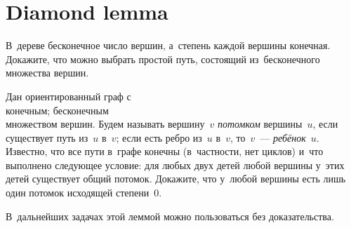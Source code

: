 
\section*{Diamond lemma}


\begin{problems}

\item
В~дереве бесконечное число вершин, а~степень каждой вершины конечная.
Докажите, что можно выбрать простой путь, состоящий из~бесконечного множества
вершин.

\item {}
Дан ориентированный граф с
\\
\subproblem конечным;
\quad
\subproblem бесконечным
\\
множеством вершин.
Будем называть вершину~$v$ \emph{потомком} вершины~$u$, если существует путь
из~$u$ в~$v$;
если есть ребро из~$u$ в~$v$, то~$v$~--- \emph{ребёнок}~$u$.
Известно, что все пути в~графе конечны (в~частности, нет циклов) и~что
выполнено следующее условие: для любых двух детей любой вершины у~этих детей
существует общий потомок.
Докажите, что у~любой вершины есть лишь один потомок исходящей степени~$0$.

\end{problems}

В~дальнейших задачах этой леммой можно пользоваться без доказательства.


